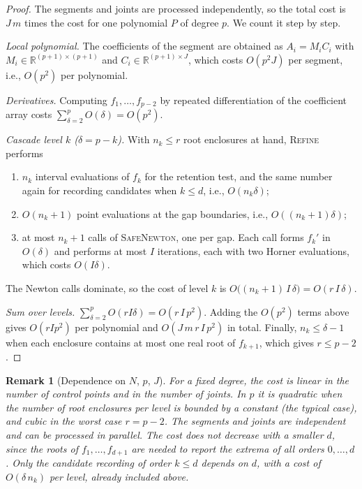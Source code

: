 \documentclass[final,5p,times,twocolumn]{elsarticle}
\newtheorem{remark}{Remark}
\theoremstyle{definition}
\begin{document}
\begin{proof}
The segments and joints are processed independently, so the total cost is $J\,m$ times the cost for one polynomial $P$ of degree $p$. We count it step by step.

\emph{Local polynomial.} The coefficients of the segment are obtained as $A_i=M_iC_i$ with $M_i\in\mathbb{R}^{(p+1)\times(p+1)}$ and $C_i\in\mathbb{R}^{(p+1)\times J}$, which costs $O(p^2J)$ per segment, i.e., $O(p^2)$ per polynomial.

\emph{Derivatives.} Computing $f_1,\dots,f_{p-2}$ by repeated differentiation of the coefficient array costs $\sum_{\delta=2}^{p}O(\delta)=O(p^2)$.

\emph{Cascade level $k$ ($\delta=p-k$).} With $n_k\le r$ root enclosures at hand, \textsc{Refine} performs
\begin{enumerate}
  \item $n_k$ interval evaluations of $f_k$ for the retention test, and the same number again for recording candidates when $k\le d$, i.e., $O(n_k\delta)$;
  \item $O(n_k+1)$ point evaluations at the gap boundaries, i.e., $O((n_k+1)\delta)$;
  \item at most $n_k+1$ calls of \textsc{SafeNewton}, one per gap. Each call forms $f_k'$ in $O(\delta)$ and performs at most $I$ iterations, each with two Horner evaluations, which costs $O(I\delta)$.
\end{enumerate}
The Newton calls dominate, so the cost of level $k$ is $O\big((n_k+1)\,I\,\delta\big)=O(r\,I\,\delta)$.

\emph{Sum over levels.} $\sum_{\delta=2}^{p}O(r I\delta)=O(r\,I\,p^2)$. Adding the $O(p^2)$ terms above gives $O(r I p^2)$ per polynomial and $O(J\,m\,r\,I\,p^2)$ in total. Finally, $n_k\le\delta-1$ when each enclosure contains at most one real root of $f_{k+1}$, which gives $r\le p-2$.
\end{proof}

\begin{remark}[Dependence on $N$, $p$, $J$]
For a fixed degree, the cost is linear in the number of control points and in the number of joints. In $p$ it is quadratic when the number of root enclosures per level is bounded by a constant (the typical case), and cubic in the worst case $r=p-2$. The segments and joints are independent and can be processed in parallel. The cost does not decrease with a smaller $d$, since the roots of $f_1,\dots,f_{d+1}$ are needed to report the extrema of all orders $0,\dots,d$. Only the candidate recording of order $k\le d$ depends on $d$, with a cost of $O(\delta\,n_k)$ per level, already included above.
\end{remark}
\end{document}
